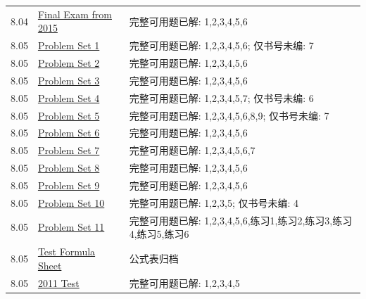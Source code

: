 \begin{longtable}{p{}p{}p{}}
8.04 & \href{https://ocw.mit.edu/courses/8-04-quantum-physics-i-spring-2016/resources/mit8_04s16_finaltest_2015/}{Final Exam from 2015} & 完整可用题已解: 1,2,3,4,5,6\\
8.05 & \href{https://ocw.mit.edu/courses/8-05-quantum-physics-ii-fall-2013/resources/assignment-1/}{Problem Set 1} & 完整可用题已解: 1,2,3,4,5,6; 仅书号未编: 7\\
8.05 & \href{https://ocw.mit.edu/courses/8-05-quantum-physics-ii-fall-2013/resources/assignment-2/}{Problem Set 2} & 完整可用题已解: 1,2,3,4,5,6\\
8.05 & \href{https://ocw.mit.edu/courses/8-05-quantum-physics-ii-fall-2013/resources/assignment-3/}{Problem Set 3} & 完整可用题已解: 1,2,3,4,5,6\\
8.05 & \href{https://ocw.mit.edu/courses/8-05-quantum-physics-ii-fall-2013/resources/assignment-4/}{Problem Set 4} & 完整可用题已解: 1,2,3,4,5,7; 仅书号未编: 6\\
8.05 & \href{https://ocw.mit.edu/courses/8-05-quantum-physics-ii-fall-2013/resources/assignment-5/}{Problem Set 5} & 完整可用题已解: 1,2,3,4,5,6,8,9; 仅书号未编: 7\\
8.05 & \href{https://ocw.mit.edu/courses/8-05-quantum-physics-ii-fall-2013/resources/assignment-6/}{Problem Set 6} & 完整可用题已解: 1,2,3,4,5,6\\
8.05 & \href{https://ocw.mit.edu/courses/8-05-quantum-physics-ii-fall-2013/resources/assignment-7/}{Problem Set 7} & 完整可用题已解: 1,2,3,4,5,6,7\\
8.05 & \href{https://ocw.mit.edu/courses/8-05-quantum-physics-ii-fall-2013/resources/assignment-8/}{Problem Set 8} & 完整可用题已解: 1,2,3,4,5,6\\
8.05 & \href{https://ocw.mit.edu/courses/8-05-quantum-physics-ii-fall-2013/resources/assignment-9/}{Problem Set 9} & 完整可用题已解: 1,2,3,4,5,6\\
8.05 & \href{https://ocw.mit.edu/courses/8-05-quantum-physics-ii-fall-2013/resources/assignment-10/}{Problem Set 10} & 完整可用题已解: 1,2,3,5; 仅书号未编: 4\\
8.05 & \href{https://ocw.mit.edu/courses/8-05-quantum-physics-ii-fall-2013/resources/assignment-11/}{Problem Set 11} & 完整可用题已解: 1,2,3,4,5,6,练习1,练习2,练习3,练习4,练习5,练习6\\
8.05 & \href{https://ocw.mit.edu/courses/8-05-quantum-physics-ii-fall-2013/resources/test-formula-sheet/}{Test Formula Sheet} & 公式表归档\\
8.05 & \href{https://ocw.mit.edu/courses/8-05-quantum-physics-ii-fall-2013/resources/test-2011/}{2011 Test} & 完整可用题已解: 1,2,3,4,5\\

\end{longtable}
